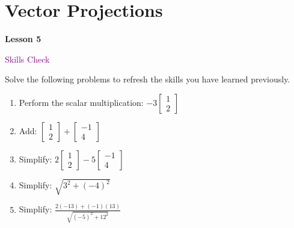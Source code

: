 \documentclass[10pt]{book}
\theoremstyle{definition}
\theoremstyle{remark}
\begin{document}
\section{Vector Projections}
\begin{tcolorbox}[
  width=\textwidth,
  colback=gray!10, %
  colframe=white, %
  boxrule=0pt,    %
  left=1cm,       %
  right=1cm,      %
  sharp corners  %
]

\begin{minipage}[t]{0.5\textwidth}
  \Huge \textbf{Lesson 5}
\end{minipage}%
\hfill
\begin{minipage}[t]{0.5\textwidth}
  \Huge \textcolor{purple}{Skills Check}
\end{minipage}
\end{tcolorbox}

\begin{large}
\noindent
Solve the following problems to refresh the skills you have learned previously.
\begin{enumerate}
\item Perform the scalar multiplication: $-3\begin{bmatrix} 1 \\ 2 \end{bmatrix}$\vfil \vfil \vfil
\item Add: $\begin{bmatrix} 1 \\ 2 \end{bmatrix} + \begin{bmatrix} -1 \\ 4 \end{bmatrix}$\vfil \vfil \vfil
\item Simplify: $2\begin{bmatrix} 1 \\ 2 \end{bmatrix} -5 \begin{bmatrix} -1 \\ 4 \end{bmatrix}$\vfil \vfil\vfil
\item Simplify: $\sqrt{3^{2}+(-4)^{2}}$\vfil \vfil \vfil
\item Simplify: $\displaystyle \frac{2(-13) + (-1)(13)}{\sqrt{(-5)^{2}+12^{2}}}$\vfil \vfil \vfil
\end{enumerate}
\end{large}
\newpage
\end{document}
